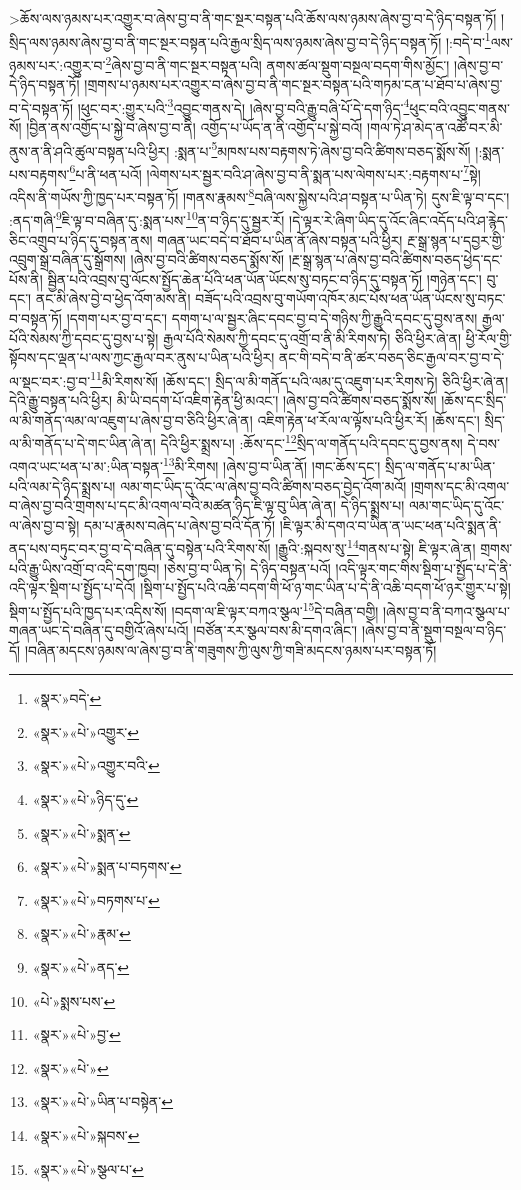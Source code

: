  >ཆོས་ལས་ཉམས་པར་འགྱུར་བ་ཞེས་བྱ་བ་ནི་གང་སྔར་བསྟན་པའི་ཆོས་ལས་ཉམས་ཞེས་བྱ་བ་དེ་ཉིད་བསྟན་ཏོ། །སྲིད་ལས་ཉམས་ཞེས་བྱ་བ་ནི་གང་སྔར་བསྟན་པའི་རྒྱལ་སྲིད་ལས་ཉམས་ཞེས་བྱ་བ་དེ་ཉིད་བསྟན་ཏོ། །:བདེ་བ་\footnote{«སྣར་»བདེ་}ལས་ཉམས་པར་:འགྱུར་བ་\footnote{«སྣར་»«པེ་»འགྱུར་}ཞེས་བྱ་བ་ནི་གང་སྔར་བསྟན་པའི། ནགས་ཚལ་སྡུག་བསྔལ་བདག་གིས་མྱོང་། །ཞེས་བྱ་བ་དེ་ཉིད་བསྟན་ཏོ། །གྲགས་པ་ཉམས་པར་འགྱུར་བ་ཞེས་བྱ་བ་ནི་གང་སྔར་བསྟན་པའི་གཏམ་ངན་པ་ཐོབ་པ་ཞེས་བྱ་བ་དེ་བསྟན་ཏོ། །ཕུང་བར་:གྱུར་པའི་\footnote{«སྣར་»«པེ་»འགྱུར་བའི་}འབྱུང་གནས་དེ། །ཞེས་བྱ་བའི་རྒྱུ་བཞི་པོ་དེ་དག་ཉིད་\footnote{«སྣར་»«པེ་»ཉིད་དུ་}ཕུང་བའི་འབྱུང་གནས་སོ། །བྱིན་ནས་འགྱོད་པ་སྐྱེ་བ་ཞེས་བྱ་བ་ནི། འགྱོད་པ་ཡོད་ན་ནི་འགྱོད་པ་སྐྱེ་བའོ། །གལ་ཏེ་ཤ་མེད་ན་འཚོ་བར་མི་ནུས་ན་ནི་ཤའི་ཚུལ་བསྟན་པའི་ཕྱིར། :སྨན་པ་\footnote{«སྣར་»«པེ་»སྨན་}མཁས་པས་བརྟགས་ཏེ་ཞེས་བྱ་བའི་ཚིགས་བཅད་སྨོས་སོ། །:སྨན་པས་བརྟགས་\footnote{«སྣར་»«པེ་»སྨན་པ་བཏགས་}པ་ནི་ཕན་པའོ། །ལེགས་པར་སྦྱར་བའི་ཤ་ཞེས་བྱ་བ་ནི་སྨན་པས་ལེགས་པར་:བརྟགས་པ་\footnote{«སྣར་»«པེ་»བཏགས་པ་}སྟེ། འདིས་ནི་གཡོས་ཀྱི་ཁྱད་པར་བསྟན་ཏོ། །གནས་རྣམས་\footnote{«སྣར་»«པེ་»རྣམ་}བཞི་ལས་སྐྱེས་པའི་ཤ་བསྟན་པ་ཡིན་ཏེ། དུས་ཇི་ལྟ་བ་དང་། :ནད་གཞི་\footnote{«སྣར་»«པེ་»ནད་}ཇི་ལྟ་བ་བཞིན་དུ་:སྨན་པས་\footnote{«པེ་»སྨས་པས་}ན་བ་ཉིད་དུ་སྦྱར་རོ། །དེ་ལྟར་རེ་ཞིག་ཡིད་དུ་འོང་ཞིང་འདོད་པའི་ཤ་རྙེད་ཅིང་འགྲུབ་པ་ཉིད་དུ་བསྟན་ནས། གཞན་ཡང་བདེ་བ་ཐོབ་པ་ཡིན་ནོ་ཞེས་བསྟན་པའི་ཕྱིར། རྔ་སྒྲ་སྙན་པ་དབྱར་གྱི་འབྲུག་སྒྲ་བཞིན་དུ་སྒྲོགས། །ཞེས་བྱ་བའི་ཚིགས་བཅད་སྨོས་སོ། །རྔ་སྒྲ་སྙན་པ་ཞེས་བྱ་བའི་ཚིགས་བཅད་ཕྱེད་དང་པོས་ནི། སྦྱིན་པའི་འབྲས་བུ་ལོངས་སྤྱོད་ཆེན་པོའི་ཕན་ཡོན་ཡོངས་སུ་བཏང་བ་ཉིད་དུ་བསྟན་ཏོ། །གཉེན་དང་། བུ་དང་། ནང་མི་ཞེས་བྱེ་བ་ཕྱེད་འོག་མས་ནི། བཟོད་པའི་འབྲས་བུ་གཡོག་འཁོར་མང་པོས་ཕན་ཡོན་ཡོངས་སུ་བཏང་བ་བསྟན་ཏོ། །དགག་པར་བྱ་བ་དང་། དགག་པ་ལ་སྦྱར་ཞིང་དབང་བྱ་བ་དེ་གཉིས་ཀྱི་རྒྱུའི་དབང་དུ་བྱས་ནས། རྒྱལ་པོའི་སེམས་ཀྱི་དབང་དུ་བྱས་པ་སྟེ། རྒྱལ་པོའི་སེམས་ཀྱི་དབང་དུ་འགྲོ་བ་ནི་མི་རིགས་ཏེ། ཅིའི་ཕྱིར་ཞེ་ན། ཕྱི་རོལ་གྱི་སྟོབས་དང་ལྡན་པ་ལས་ཀྱང་རྒྱལ་བར་ནུས་པ་ཡིན་པའི་ཕྱིར། ནང་གི་བདེ་བ་ནི་ཚར་བཅད་ཅིང་རྒྱལ་བར་བྱ་བ་དེ་ལ་སྡང་བར་:བྱ་བ་\footnote{«སྣར་»«པེ་»བྱ་}མི་རིགས་སོ། །ཆོས་དང་། སྲིད་ལ་མི་གནོད་པའི་ལམ་དུ་འཇུག་པར་རིགས་ཏེ། ཅིའི་ཕྱིར་ཞེ་ན། དེའི་རྒྱུ་བསྟན་པའི་ཕྱིར། མི་ཡི་བདག་པོ་འཇིག་རྟེན་ཕྱི་མའང་། །ཞེས་བྱ་བའི་ཚིགས་བཅད་སྨོས་སོ། །ཆོས་དང་སྲིད་ལ་མི་གནོད་ལམ་ལ་འཇུག་པ་ཞེས་བྱ་བ་ཅིའི་ཕྱིར་ཞེ་ན། འཇིག་རྟེན་ཕ་རོལ་ལ་ལྟོས་པའི་ཕྱིར་རོ། །ཆོས་དང་། སྲིད་ལ་མི་གནོད་པ་དེ་གང་ཡིན་ཞེ་ན། དེའི་ཕྱིར་སྨྲས་པ། :ཆོས་དང་\footnote{«སྣར་»«པེ་»}སྲིད་ལ་གནོད་པའི་དབང་དུ་བྱས་ནས། དེ་བས་འགའ་ཡང་ཕན་པ་མ་:ཡིན་བསྟན་\footnote{«སྣར་»«པེ་»ཡིན་པ་བསྟེན་}མི་རིགས། །ཞེས་བྱ་བ་ཡིན་ནོ། །གང་ཆོས་དང་། སྲིད་ལ་གནོད་པ་མ་ཡིན་པའི་ལམ་དེ་ཉིད་སྨྲས་པ། ལམ་གང་ཡིད་དུ་འོང་ལ་ཞེས་བྱ་བའི་ཚིགས་བཅད་བྱེད་འོག་མའོ། །གྲགས་དང་མི་འགལ་བ་ཞེས་བྱ་བའི་གྲགས་པ་དང་མི་འགལ་བའི་མཚན་ཉིད་ཇི་ལྟ་བུ་ཡིན་ཞེ་ན། དེ་ཉིད་སྨྲས་པ། ལམ་གང་ཡིད་དུ་འོང་ལ་ཞེས་བྱ་བ་སྟེ། དམ་པ་རྣམས་བཞེད་པ་ཞེས་བྱ་བའི་དོན་ཏོ། །ཇི་ལྟར་མི་དགའ་བ་ཡིན་ན་ཡང་ཕན་པའི་སྨན་ནི་ནད་པས་བཏུང་བར་བྱ་བ་དེ་བཞིན་དུ་བསྟེན་པའི་རིགས་སོ། །རྒྱུའི་:སྐབས་སུ་\footnote{«སྣར་»«པེ་»སྐབས་}གནས་པ་སྟེ། ཇི་ལྟར་ཞེ་ན། གྲགས་པའི་རྒྱུ་ཡིས་འགྲོ་བ་འདི་དག་ཁྱབ། །ཅེས་བྱ་བ་ཡིན་ཏེ། དེ་ཉིད་བསྟན་པའོ། །འདི་ལྟར་གང་གིས་སྡིག་པ་སྤྱོད་པ་དེ་ནི་འདི་ལྟར་སྡིག་པ་སྤྱོད་པ་དེའོ། །སྡིག་པ་སྤྱོད་པའི་འཆི་བདག་གི་ཕོ་ཉ་གང་ཡིན་པ་དེ་ནི་འཆི་བདག་ཕོ་ཉར་གྱུར་པ་སྟེ། སྡིག་པ་སྤྱོད་པའི་ཁྱད་པར་འདིས་སོ། །བདག་ལ་ཇི་ལྟར་བཀའ་སྩལ་\footnote{«སྣར་»«པེ་»སྩལ་པ་}དེ་བཞིན་བགྱི། །ཞེས་བྱ་བ་ནི་བཀའ་སྩལ་པ་གཞན་ཡང་དེ་བཞིན་དུ་བགྱིའོ་ཞེས་པའོ། །བཙོན་རར་སྩལ་བས་མི་དགའ་ཞིང་། །ཞེས་བྱ་བ་ནི་སྡུག་བསྔལ་བ་ཉིད་དོ། །བཞིན་མདངས་ཉམས་ལ་ཞེས་བྱ་བ་ནི་གཟུགས་ཀྱི་ལུས་ཀྱི་གཟི་མདངས་ཉམས་པར་བསྟན་ཏོ། 